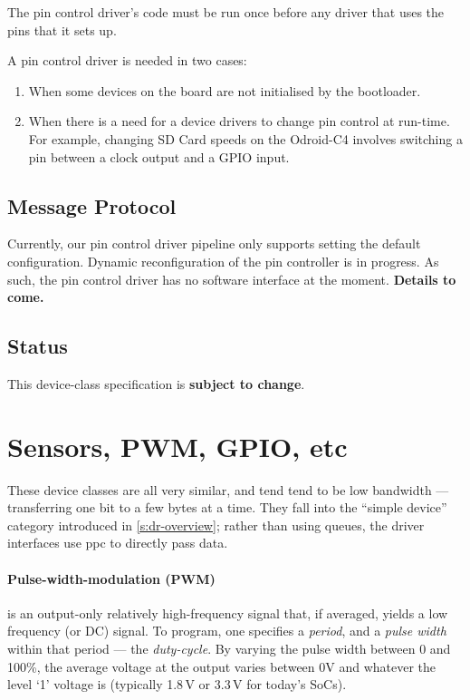 \documentclass[a4paper,12pt]{report}
\newcommand{\ToCome}[1]{\textbf{#1 to come.}}
\begin{document}
The pin control driver's code must be run once before any driver that
uses the pins that it sets up.
\fi

A pin control driver is needed in two cases:
\begin{enumerate}
  \item When some devices on the board are not initialised by the bootloader.
  \item When there is a need for a device drivers to change pin
    control at run-time. For example, changing SD Card speeds on the
    Odroid-C4 involves switching a pin between a clock output and a
    GPIO input.
\end{enumerate}


\subsection{Message Protocol}

Currently, our pin control driver pipeline only supports setting the
default configuration. Dynamic reconfiguration of the pin controller
is in progress.  As such, the pin control driver has no software
interface at the moment.  \ToCome{Details}

\subsection{Status}

This device-class specification is \textbf{subject to change}.

\section{Sensors, PWM, GPIO, etc}\label{s:sensors}

These device classes are all very similar, and tend tend to be low
bandwidth --- transferring one bit to a few bytes at a time.  They
fall into the ``simple device'' category introduced in
\autoref{s:dr-overview}; rather than
using queues, the driver interfaces use \gls{ppc} to directly pass data.

\paragraph{Pulse-width-modulation (PWM)} is an output-only relatively
high-frequency signal that, if averaged, yields a low frequency (or
DC) signal.  To program, one specifies a \emph{period}, and a \emph{pulse width}
within that period --- the \emph{duty-cycle}.  By varying the
pulse width between 0 and 100\%, the average voltage at the output
varies between 0V and whatever the level `1' voltage is (typically
1.8\,V or 3.3\,V for today's SoCs).
\end{document}
